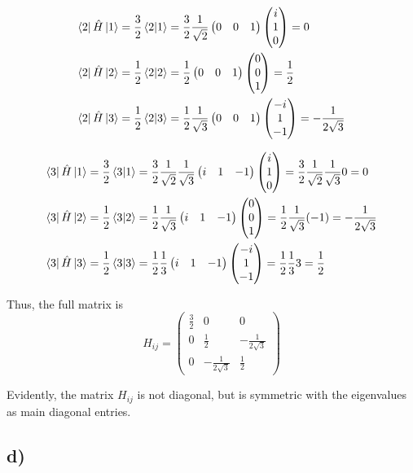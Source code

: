 \documentclass{article}
\newcommand*\colvec[3][]{
    \begin{pmatrix}\ifx\relax#1\relax\else#1\\\fi#2\\#3\end{pmatrix}
}
\begin{document}
\begin{align}
\bra{2}\hat{H}\ket{1} &= \frac{3}{2}\braket{2}{1}
= \frac{3}{2}\frac{1}{\sqrt{2}}\begin{pmatrix} 0 & 0 &
  1 \end{pmatrix}\colvec[i]{1}{0} =0
\\
\bra{2}\hat{H}\ket{2} &= \frac{1}{2}\braket{2}{2} 
=\frac{1}{2}\begin{pmatrix} 0 & 0 & 1 \end{pmatrix}
\colvec[0]{0}{1}
=\frac{1}{2}
\\
\bra{2}\hat{H}\ket{3} &= \frac{1}{2}\braket{2}{3} 
=\frac{1}{2}\frac{1}{\sqrt{3}}\begin{pmatrix} 0 &  0 & 1 \end{pmatrix}
\colvec[-i]{1}{-1} = -\frac{1}{2\sqrt{3}}
\end{align}

\begin{align}
\bra{3}\hat{H}\ket{1} &=
\frac{3}{2}\braket{3}{1}=
\frac{3}{2}\frac{1}{\sqrt{2}}\frac{1}{\sqrt{3}}
\begin{pmatrix}
i & 1 & -1
\end{pmatrix}
\colvec[i]{1}{0}
= \frac{3}{2}\frac{1}{\sqrt{2}}\frac{1}{\sqrt{3}}0
= 0
\\
\bra{3}\hat{H}\ket{2} &=
\frac{1}{2}\braket{3}{2}=
\frac{1}{2}\frac{1}{\sqrt{3}}
\begin{pmatrix}
i & 1 & -1
\end{pmatrix}
\colvec[0]{0}{1}=
\frac{1}{2}\frac{1}{\sqrt{3}}(-1)=-\frac{1}{2\sqrt{3}}
\\
\bra{3}\hat{H}\ket{3} &=
\frac{1}{2}\braket{3}=
\frac{1}{2}\frac{1}{3}
\begin{pmatrix}
i & 1 & -1
\end{pmatrix}
\colvec[-i]{1}{-1}=
\frac{1}{2}\frac{1}{3}3=\frac{1}{2}
\end{align}

Thus, the full matrix is
\begin{equation}
H_{ij}=\begin{pmatrix}
\frac{3}{2} & 0 & 0 \\
0 & \frac{1}{2} & -\frac{1}{2\sqrt{3}} \\
0 & -\frac{1}{2\sqrt{3}} & \frac{1}{2}
\end{pmatrix}
\end{equation}

Evidently, the matrix $H_{ij}$ is not diagonal, but is symmetric with the eigenvalues as main diagonal entries.

\subsection*{d)}
\end{document}
